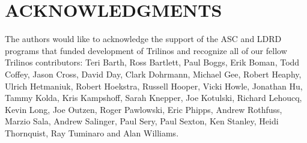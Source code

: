 \documentclass[times,10pt,twocolumn]{article}
\begin{document}
\section{ACKNOWLEDGMENTS}

The authors would like to acknowledge the support of the ASC and
LDRD programs that funded development of Trilinos and recognize all
of our fellow Trilinos contributors: Teri Barth,
Ross Bartlett, Paul Boggs, Erik Boman, Todd Coffey, Jason Cross,
David Day, Clark Dohrmann,
Michael Gee, Robert Heaphy, Ulrich Hetmaniuk, Robert Hoekstra,
Russell Hooper, Vicki Howle, Jonathan Hu, Tammy Kolda, Kris
Kampshoff, Sarah Knepper, Joe Kotulski, Richard Lehoucq, Kevin Long,
Joe Outzen, Roger Pawlowski, Eric Phipps, Andrew Rothfuss, Marzio
Sala, Andrew Salinger, Paul Sery, Paul Sexton, Ken Stanley, Heidi
Thornquist, Ray Tuminaro and Alan Williams.



\end{document}
